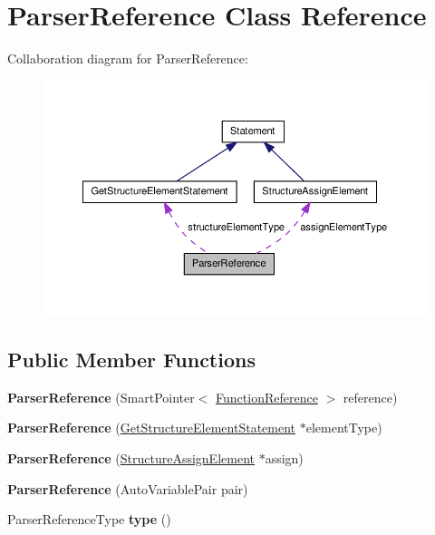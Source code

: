 \hypertarget{class_parser_reference}{\section{Parser\-Reference Class Reference}
\label{class_parser_reference}
}


Collaboration diagram for Parser\-Reference\-:
\nopagebreak
\begin{figure}[H]
\begin{center}
\leavevmode
\includegraphics[width=350pt]{class_parser_reference__coll__graph}
\end{center}
\end{figure}
\subsection*{Public Member Functions}
\begin{DoxyCompactItemize}
\item 
\hypertarget{class_parser_reference_a6ea10c40b648cea7364d49646465fbb2}{{\bfseries Parser\-Reference} (Smart\-Pointer$<$ \hyperlink{class_function_reference}{Function\-Reference} $>$ reference)}\label{class_parser_reference_a6ea10c40b648cea7364d49646465fbb2}

\item 
\hypertarget{class_parser_reference_a80fb2a5708720a27f1d1327e91ec6a9b}{{\bfseries Parser\-Reference} (\hyperlink{class_get_structure_element_statement}{Get\-Structure\-Element\-Statement} $\ast$element\-Type)}\label{class_parser_reference_a80fb2a5708720a27f1d1327e91ec6a9b}

\item 
\hypertarget{class_parser_reference_a633fce496d8da67fdf9877bc2c6e6738}{{\bfseries Parser\-Reference} (\hyperlink{class_structure_assign_element}{Structure\-Assign\-Element} $\ast$assign)}\label{class_parser_reference_a633fce496d8da67fdf9877bc2c6e6738}

\item 
\hypertarget{class_parser_reference_a229c39350b7c31d7a1f6fe6459b88c74}{{\bfseries Parser\-Reference} (Auto\-Variable\-Pair pair)}\label{class_parser_reference_a229c39350b7c31d7a1f6fe6459b88c74}

\item 
\hypertarget{class_parser_reference_a2316811d64a34a3488a6ad14e6b1e418}{Parser\-Reference\-Type {\bfseries type} ()}\label{class_parser_reference_a2316811d64a34a3488a6ad14e6b1e418}

\end{DoxyCompactItemize}
